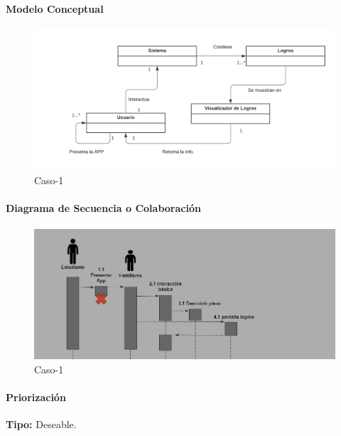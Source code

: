 \paragraph{Modelo Conceptual}

\begin{figure}[H]
\centerline{\includegraphics[width=15cm]{imgs/ModeloConceptualCaso_7_3.png}}
\caption{Caso-1}
\label{fig}
\end{figure}

\paragraph{Diagrama de Secuencia o Colaboración}

\begin{figure}[H]
\centerline{\includegraphics[width=15cm]{imgs/CasoUso_7_2.PNG}}
\caption{Caso-1}
\label{fig}
\end{figure}

\paragraph{Priorización}
{\textbf {Tipo:}}
Deseable.